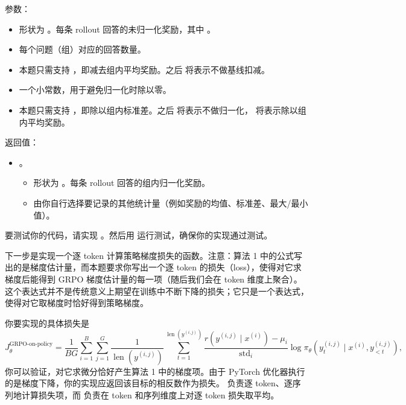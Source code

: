参数：

\begin{itemize}
  \item {} 形状为 。每条 rollout 回答的未归一化奖励，其中 。
  \item {} 每个问题（组）对应的回答数量。
  \item {} 本题只需支持 ，即减去组内平均奖励。之后  将表示不做基线扣减。
  \item {} 一个小常数，用于避免归一化时除以零。
  \item {} 本题只需支持 ，即除以组内标准差。之后  将表示不做归一化， 将表示除以组内平均奖励。
\end{itemize}

返回值：

\begin{itemize}
  \item {}。
  \begin{itemize}
    \item {} 形状为 。每条 rollout 回答的组内归一化奖励。
    \item {} 由你自行选择要记录的其他统计量（例如奖励的均值、标准差、最大/最小值）。
  \end{itemize}
\end{itemize}

要测试你的代码，请实现 。然后用  运行测试，确保你的实现通过测试。

下一步是实现一个逐 token 计算策略梯度损失的函数。注意：算法 1 中的公式写出的是梯度估计量，而本题要求你写出一个逐 token 的损失（loss），使得对它求梯度后能得到 GRPO 梯度估计量的每一项（随后我们会在 token 维度上聚合）。这个表达式并不是传统意义上期望在训练中不断下降的损失；它只是一个表达式，使得对它取梯度时恰好得到策略梯度。

你要实现的具体损失是
\begin{equation}
J_\theta^{\text{GRPO-on-policy}}
= \frac{1}{BG} \sum_{i=1}^{B} \sum_{j=1}^{G} \frac{1}{\operatorname{len}\!\left(y^{(i,j)}\right)}
\sum_{t=1}^{\operatorname{len}\!\left(y^{(i,j)}\right)}
\frac{r\!\left(y^{(i,j)} \mid x^{(i)}\right) - \mu_i}{\operatorname{std}_i}
\log \pi_\theta\!\left( y_t^{(i,j)} \mid x^{(i)}, y^{(i,j)}_{<t} \right),
\end{equation}
你可以验证，对它求微分恰好产生算法 1 中的梯度项。由于 PyTorch 优化器执行的是梯度下降，你的实现应返回该目标的相反数作为损失。 负责逐 token、逐序列地计算损失项，而  负责在 token 和序列维度上对逐 token 损失取平均。


